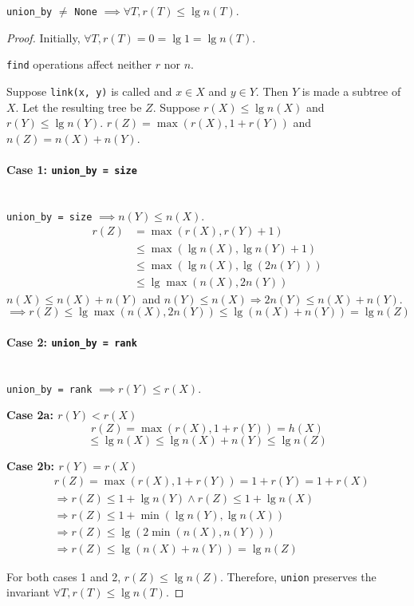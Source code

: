\begin{theorem}
\textup{\texttt{union\_by}} $\neq$ \textup{\texttt{None}} $\implies \forall T, r(T) \le \lg n(T)$.
\end{theorem}
\begin{proof}
Initially, $\forall T, r(T) = 0 = \lg 1 = \lg n(T)$.

\texttt{find} operations affect neither $r$ nor $n$.

Suppose \texttt{link(x, y)} is called and $x \in X$ and $y \in Y$.
Then $Y$ is made a subtree of $X$. Let the resulting tree be $Z$.
Suppose $r(X) \le \lg n(X)$ and $r(Y) \le \lg n(Y)$.
$r(Z) = \max(r(X), 1 + r(Y))$ and $n(Z) = n(X) + n(Y)$.

\paragraph{Case 1: \texttt{union\_by = size}} \mbox{}\\
\texttt{union\_by = size} $\implies n(Y) \le n(X)$.
\begin{align*}
r(Z) &= \max(r(X), r(Y) + 1)
\\ &\le \max(\lg n(X), \lg n(Y) + 1)
\\ &\le \max(\lg n(X), \lg(2n(Y)))
\\ &\le \lg\max(n(X), 2n(Y))
\end{align*}
$n(X) \le n(X) + n(Y)$ and
$n(Y) \le n(X) \Rightarrow 2n(Y) \le n(X) + n(Y)$.
\[\implies r(Z) \le \lg\max(n(X), 2n(Y)) \le \lg(n(X) + n(Y)) = \lg n(Z) \]

\paragraph{Case 2: \texttt{union\_by = rank}} \mbox{}\\
\texttt{union\_by = rank} $\implies r(Y) \le r(X)$.

\textbf{Case 2a: $r(Y) < r(X)$}\\
\[ r(Z) = \max(r(X), 1 + r(Y)) = h(X) \]
\[ \le \lg n(X) \le \lg n(X) + n(Y) \le \lg n(Z) \]

\textbf{Case 2b: $r(Y) = r(X)$}
\begin{align*}
& r(Z) = \max(r(X), 1 + r(Y)) = 1 + r(Y) = 1 + r(X)
\\ &\Rightarrow r(Z) \le 1 + \lg n(Y) \wedge r(Z) \le 1 + \lg n(X)
\\ &\Rightarrow r(Z) \le 1 + \min(\lg n(Y), \lg n(X))
\\ &\Rightarrow r(Z) \le \lg(2\min(n(X), n(Y)))
\\ &\Rightarrow r(Z) \le \lg(n(X) + n(Y)) = \lg n(Z)
\end{align*}

For both cases 1 and 2, $r(Z) \le \lg n(Z)$.
Therefore, \texttt{union} preserves the invariant $\forall T, r(T) \le \lg n(T)$.
\end{proof}

